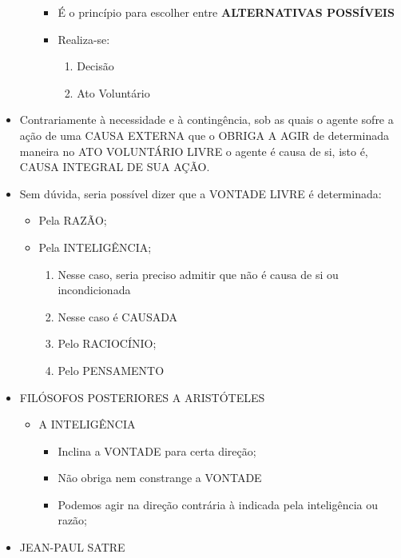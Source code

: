 \documentclass[
]{book}
\providecommand{\tightlist}{%
  \setlength{\itemsep}{0pt}\setlength{\parskip}{0pt}}
\begin{document}
\begin{itemize}
\begin{itemize}
    \begin{itemize}
    \tightlist
    \item
      É o princípio para escolher entre \textbf{ALTERNATIVAS POSSÍVEIS}
    \item
      Realiza-se:

      \begin{enumerate}
      \def\labelenumi{\alph{enumi}.}
      \tightlist
      \item
        Decisão
      \item
        Ato Voluntário
      \end{enumerate}
    \end{itemize}
  \end{itemize}
\item
  Contrariamente à necessidade e à contingência, sob as quais o agente
  sofre a ação de uma CAUSA EXTERNA que o OBRIGA A AGIR de determinada
  maneira no ATO VOLUNTÁRIO LIVRE o agente é causa de si, isto é, CAUSA
  INTEGRAL DE SUA AÇÃO.
\item
  Sem dúvida, seria possível dizer que a VONTADE LIVRE é determinada:

  \begin{itemize}
  \tightlist
  \item
    Pela RAZÃO;
  \item
    Pela INTELIGÊNCIA;

    \begin{enumerate}
    \def\labelenumi{\alph{enumi}.}
    \tightlist
    \item
      Nesse caso, seria preciso admitir que não é causa de si ou
      incondicionada
    \item
      Nesse caso é CAUSADA
    \item
      Pelo RACIOCÍNIO;
    \item
      Pelo PENSAMENTO
    \end{enumerate}
  \end{itemize}
\item
  FILÓSOFOS POSTERIORES A ARISTÓTELES

  \begin{itemize}
  \tightlist
  \item
    A INTELIGÊNCIA

    \begin{itemize}
    \tightlist
    \item
      Inclina a VONTADE para certa direção;
    \item
      Não obriga nem constrange a VONTADE
    \item
      Podemos agir na direção contrária à indicada pela inteligência ou
      razão;
    \end{itemize}
  \end{itemize}
\item
  JEAN-PAUL SATRE


\end{itemize}
\end{document}

